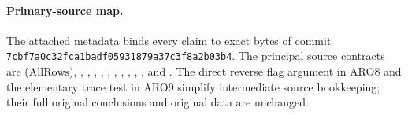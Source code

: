 \paragraph{Primary-source map.}
The attached metadata binds every claim to exact bytes of commit
\texttt{7cbf7a0c32fca1badf05931879a37c3f8a2b03b4}.
The principal source contracts are 
(\(\mathrm{AllRows}\)), ,
, ,
, ,
, ,
, ,
, and .
The direct reverse flag argument in ARO8 and the elementary trace
test in ARO9 simplify intermediate source bookkeeping; their full
original conclusions and original data are unchanged.
